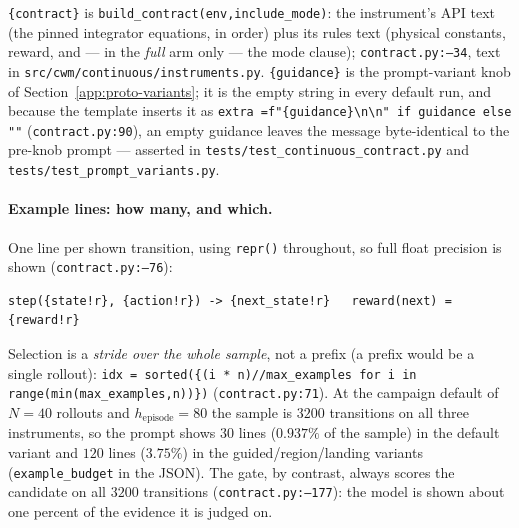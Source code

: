 \noindent \texttt{\{contract\}} is \texttt{build\_\allowbreak contract(env,\allowbreak  include\_\allowbreak mode)\allowbreak }:
the instrument's API text (the pinned integrator equations, in order) plus its
rules text (physical constants, reward, and --- in the \emph{full} arm only ---
the mode clause); \texttt{contract.\allowbreak py:--34}, text in
\texttt{src/\allowbreak cwm/\allowbreak continuous/\allowbreak instruments.\allowbreak py}. \texttt{\{guidance\}} is the
prompt-variant knob of Section~\ref{app:proto-variants}; it is the empty string
in every default run, and because the template inserts it as
\texttt{extra =\allowbreak  f"\{guidance\}\textbackslash n\textbackslash n" if guidance else ""}
(\texttt{contract.py:90}), an empty guidance leaves the message byte-identical to
the pre-knob prompt --- asserted in
\texttt{tests/\allowbreak test\_\allowbreak continuous\_\allowbreak contract.\allowbreak py} and
\texttt{tests/\allowbreak test\_\allowbreak prompt\_\allowbreak variants.\allowbreak py}.

\paragraph{Example lines: how many, and which.} One line per shown transition,
using \texttt{repr()} throughout, so full float precision is shown
(\texttt{contract.\allowbreak py:--76}):

{\small
\begin{verbatim}
step({state!r}, {action!r}) -> {next_state!r}   reward(next) = {reward!r}
\end{verbatim}
}

\noindent Selection is a \emph{stride over the whole sample}, not a prefix (a
prefix would be a single rollout):
\texttt{idx = sorted(\{(i * n)\allowbreak  /\allowbreak /\allowbreak  max\_\allowbreak examples for i in range(min(max\_\allowbreak examples,\allowbreak  n)\allowbreak )\allowbreak \})}
(\texttt{contract.py:71}). At the campaign default of $N = 40$ rollouts and
$h_\mathrm{episode} = 80$ the sample is $3200$ transitions on all three
instruments, so the prompt shows $30$ lines ($0.937\%$ of the sample) in the
default variant and $120$ lines ($3.75\%$) in the guided/region/landing variants
(\texttt{example\_budget} in the JSON). The gate, by contrast, always scores the
candidate on all $3200$ transitions (\texttt{contract.\allowbreak py:--177}): the model is
shown about one percent of the evidence it is judged on.

